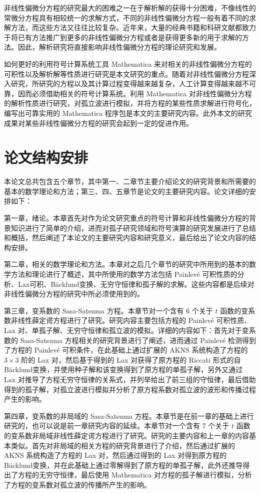 非线性偏微分方程的研究最大的困难之一在于解析解的获得十分困难，不像线性的常微分方程具有相较统一的求解方式，不同的非线性偏微分方程一般有着不同的求解方法，而这些方法又往往比较复杂。近年来，大量的经典书籍和科研文献都致力于将已有方法推广到更多的非线性偏微分方程或者是获得更多新的用于求解的方法。因此，解析研究将直接影响非线性偏微分方程的理论研究和发展。

如何更好的利用符号计算系统工具 Mathematica 来对相关的非线性偏微分方程的可积性以及解析解等性质进行研究是本文研究的重点。随着对非线性偏微分方程深入研究，所研究的方程以及其计算过程变得越来越复杂，人工计算变得越来越不可靠，因而必须借助相关的符号计算系统。利用 Mathematica 对非线性偏微分方程的解析性质进行研究，对孤立波进行模拟，并将方程的某些性质求解进行符号化，编写出可靠实用的 Mathematica 程序包是本文的主要研究内容。此外本文的研究成果对某些非线性偏微分方程的研究会起到一定的促进作用。

\section{论文结构安排}
本论文总共包含五个章节，其中第一、二章节主要介绍论文的研究背景和所需要的基本的数学理论和方法；第三、四、五章节是论文的主要研究内容。论文详细的安排如下：

第一章，绪论。本章首先对作为论文研究重点的符号计算和非线性偏微分方程的背景知识进行了简单的介绍，进而对孤子研究领域和符号演算的研究发展进行了总结和概括，然后阐述了本论文的主要研究内容和研究意义，最后给出了论文内容的结构安排。

第二章，相关的数学理论和方法。本章对之后几个章节的研究中所用到的基本的数学方法和理论进行了概述，其中所使用的数学方法包括 Painlev\'{e} 可积性质的分析、Lax可积、B\"{a}cklund变换、无穷守恒律和孤子解的求解。这些内容都是后续对非线性偏微分方程的研究中所必须使用到的。

第三章，变系数的 Sasa-Satsuma 方程。本章节对一个含有 6 个关于 $t$ 函数的变系数非线性薛定谔方程进行了研究。研究内容主要包括方程的 Painlev\'{e} 可积性质、Lax 对、单孤子解、无穷守恒律和孤立波的模拟。详细的内容如下：首先对于变系数的 Sasa-Satsuma 方程相关的研究背景进行了阐述，进而通过  Painlev\'{e} 检测得到了方程的  Painlev\'{e} 可积条件，在此基础上通过扩展的 AKNS 系统构造了方程的 $3 \times 3$ 阶的 Lax 对，然后基于得到的 Lax 对获得了原方程的 Riccati 形式的自 B\"{a}cklund变换，并使用种子解和该变换得到了原方程的单孤子解，另外又通过 Lax 对推导了方程无穷守恒律的关系式，并列举给出了前三组的守恒律，最后借助得到的孤子解，对孤立波进行模拟并分析了原方程系数对孤立波的波形和传播过程产生的影响。

第四章，变系数的非局域的 Sasa-Satsuma 方程。本章节是在前一章的基础上进行研究的，也可以说是前一章研究内容的延续。本章节对一个含有 7 个关于 $t$ 函数的变系数非局域非线性薛定谔方程进行了研究。研究的主要内容和上一章的内容基本类似。首先对非局域的相关方程的研究背景进行了介绍，然后通过扩展的 AKNS 系统构造了方程的 Lax 对，然后通过得到的 Lax 对得到原方程的 B\"{a}cklund变换，并在此基础上通过零解得到了原方程的单孤子解，此外还推导得出了方程的无穷守恒律，最后使用 Mathematica 对方程的孤子解进行模拟，分析了方程的变系数对孤立波的传播所产生的影响。

